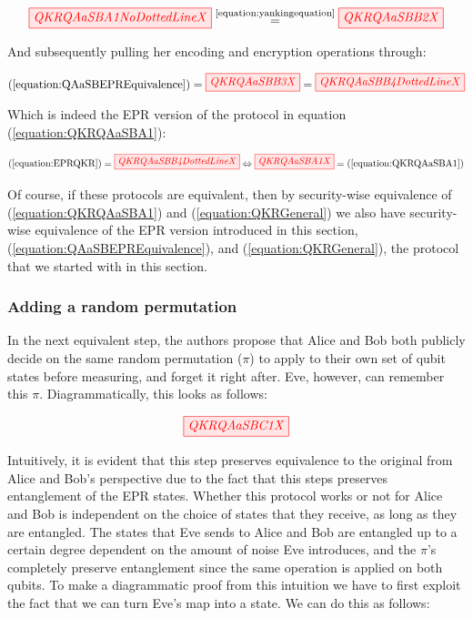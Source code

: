 \documentclass[]{article}
\newcommand{\equaltext}[1]{\ensuremath{\stackrel{\text{#1}}{=}}}
\begin{document}
\begin{equation}
	\label{equation:QAaSBEPREquivalence}
	\begin{aligned}
	\tikzfig{QKRQAaSBA1NoDottedLineX} \equaltext{\ref{equation:yankingequation}} \tikzfig{QKRQAaSBB2X}
	\end{aligned}
\end{equation}

And subsequently pulling her encoding and encryption operations through:

\begin{equation}
\label{equation:EPRQKR}
	\begin{aligned}
 (\ref{equation:QAaSBEPREquivalence}) = \tikzfig{QKRQAaSBB3X} = \tikzfig{QKRQAaSBB4DottedLineX}
\end{aligned}
\end{equation}

Which is indeed the EPR version of the protocol in equation (\ref{equation:QKRQAaSBA1}): 

\begin{equation}
\label{equation:QKRQAaSBB4DottedLine}
	(\ref{equation:EPRQKR}) = \tikzfig{QKRQAaSBB4DottedLineX} \Leftrightarrow \tikzfig{QKRQAaSBA1X} = (\ref{equation:QKRQAaSBA1})
\end{equation}

Of course, if these protocols are equivalent, then by security-wise equivalence of (\ref{equation:QKRQAaSBA1}) and (\ref{equation:QKRGeneral}) we also have security-wise equivalence of the EPR version introduced in this section, (\ref{equation:QAaSBEPREquivalence}), and (\ref{equation:QKRGeneral}), the protocol that we started with in this section. 

\subsubsection{Adding a random permutation}

In the next equivalent step, the authors propose that Alice and Bob both publicly decide on the same random permutation ($\pi$) to apply to their own set of qubit states before measuring, and forget it right after. Eve, however, can remember this $\pi$. Diagrammatically, this looks as follows:

\begin{equation}
	\label{equation:QKRQAaSBC1}
	\tikzfig{QKRQAaSBC1X}
\end{equation}

Intuitively, it is evident that this step preserves equivalence to the original from Alice and Bob's perspective due to the fact that this steps preserves entanglement of the EPR states. Whether this protocol works or not for Alice and Bob is independent on the choice of states that they receive, as long as they are entangled. The states that Eve sends to Alice and Bob are entangled up to a certain degree dependent on the amount of noise Eve introduces, and the $\pi$'s completely preserve entanglement since the same operation is applied on both qubits. To make a diagrammatic proof from this intuition we have to first exploit the fact that we can turn Eve's map into a state. We can do this as follows:
\end{document}
